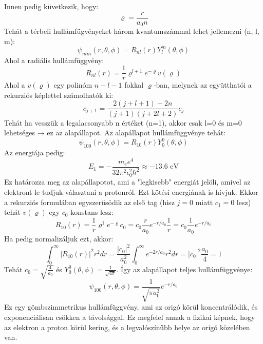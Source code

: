 \documentclass[a4paper,12pt]{article}
\begin{document}
Innen pedig küvetkezik, hogy:
\begin{equation}
    \varrho = \frac{r}{a_0 n}
\end{equation}
Tehát a térbeli hullámfügvényeket három kvantumszámmal lehet jellemezni (n, l, m):
\begin{equation}
    \psi_{n l m}(r, \theta, \phi) = R_{n l}(r) Y_{l}^m(\theta, \phi)
\end{equation}
Ahol a radiális hullámfüggvény:
\begin{equation}
    R_{n l}(r) = \frac{1}{r}\varrho^{l + 1} e^{-\varrho} v(\varrho)
\end{equation}
Ahol a $v(\varrho)$ egy polinóm $n-l-1$ fokkal $\varrho$-ban, melynek az együtthatói a rekurziós képlettel számolhatók ki:
\begin{equation}
    c_{j + 1} = \frac{2(j + l + 1) - 2n}{(j + 1)(j + 2l + 2)} c_j
\end{equation}
Tehát ha vesszük a legalacsonyabb n értéket (n=1), akkor csak l=0 és m=0 lehetséges → ez az alapállapot.
Az alapállapot hullámfüggvénye tehát:
\begin{equation}
    \psi_{100}(r, \theta, \phi) = R_{10}(r) Y_0^0(\theta, \phi)
\end{equation}
Az energiája pedig:
\begin{equation}
    E_1 = - \frac{m_e e^4}{32 \pi^2 \epsilon_0^2 \hbar^2} \approx -13.6 \text{ eV}
\end{equation}
Ez határozza meg az alapállapotot, ami a "legkisebb" energiát jelöli, amivel az elektront le tudjuk választani a protonról. Ezt kötési energiának is hívjuk.
Ekkor a rekurziós formulában egyszerűsödik az első tag (hisz $j = 0$ miatt $c_1 = 0$ lesz) tehát $v(\varrho)$ egy $c_0$ konstans lesz:
\begin{equation}
    R_ {10}(r) = \frac{1}{r} \varrho^{1} e^{-\varrho} c_0 = c_0 \frac{r}{a_0} e^{-r/a_0} \frac{1}{r} = c_0 \frac{1}{a_0} e^{-r/a_0}
\end{equation}
Ha pedig normalizáljuk ezt, akkor:
\begin{equation}
   \int_{0}^{\infty} |R_{10}(r)|^2 r^2 dr = \frac{|c_0|^2}{a_0^2} \int_{0}^{\infty} e^{-2r/a_0} r^2 dr = |c_0|^2 \frac{a_0}{4} = 1
\end{equation}
Tehát $c_0 = \sqrt{\frac{4}{a_0}}$ és $Y_0^0(\theta, \phi) = \frac{1}{\sqrt{4 \pi}}$. Így az alapállapot teljes hullámfüggvénye:
\begin{equation}
    \psi_{100}(r, \theta, \phi) = \frac{1}{\sqrt{\pi a_0^3}} e^{-r/a_0}
\end{equation}
Ez egy gömbszimmetrikus hullámfüggvény, ami az origó körül koncentrálódik, és exponenciálisan csökken a távolsággal. Ez megfelel annak a fizikai képnek, hogy az elektron a proton körül kering,
és a legvalószínűbb helye az origó közelében van.
\end{document}
